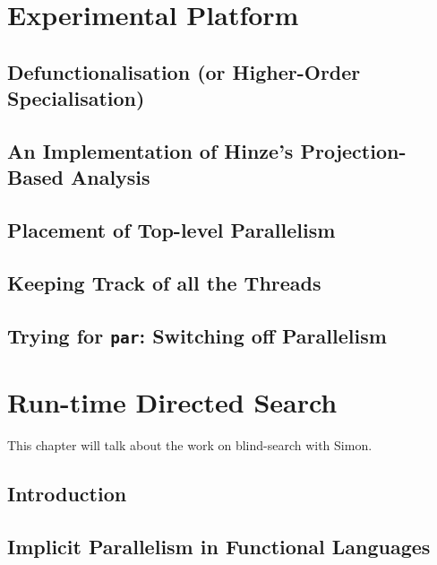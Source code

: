 \documentclass[justified, twoside, a4paper, symmetric]{tufte-book}
\begin{document}
\chapter{Experimental Platform}

    

    \section{Defunctionalisation (or Higher-Order Specialisation)}
    \label{sec:defunctionalisation}
    

    \section{An Implementation of Hinze's Projection-Based Analysis}
    \label{sec:hinzeImplementation}
    
    \section{Placement of Top-level Parallelism}
    \label{sec:parPlacement}
    

    \section{Keeping Track of all the Threads}
    \label{sec:logging}
    

    \section{Trying for \texttt{par}: Switching off Parallelism}
    \label{sec:parSwitching}
    

\chapter{Run-time Directed Search}

    This chapter will talk about the work on blind-search with Simon.

    \section{Introduction}
    

    \section{Implicit Parallelism in Functional Languages}
    \label{sec:blind-ParFunc}
    
\end{document}
